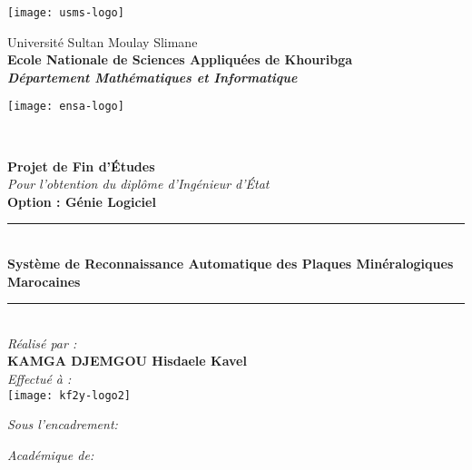 \begin{titlepage}
\begin{minipage}{2cm}
	\begin{flushleft}
		\texttt{[image: usms-logo]}
	\end{flushleft}
\end{minipage}\hfill
\begin{minipage}{12cm}
	\begin{center}
		Université Sultan Moulay Slimane\\
		\textbf{Ecole Nationale de Sciences Appliquées de Khouribga}\\
		\textit{\textbf{Département Mathématiques et Informatique}}
	\end{center}
\end{minipage}\hfill
\begin{minipage}{2cm}
	\begin{flushright}
		\texttt{[image: ensa-logo]}
	\end{flushright}
\end{minipage}\\
\begin{center}
{\large \bfseries Projet de Fin d’Études}\\[0.5cm]
{\large \textit{Pour l'obtention du diplôme d'Ingénieur d'État}}\\[0.5cm]
{\large \bfseries{Option : Génie Logiciel} \\ }
\vspace{10mm}
\rule{0.95\textwidth}{2pt}\vspace{0.9\baselineskip}\\
			{\Large \textrm{\textbf{Système de Reconnaissance Automatique des Plaques Minéralogiques Marocaines}}}
\rule{0.95\textwidth}{2pt}\\
\vspace{10mm}
\emph{Réalisé par :}\\[0.5cm]
\large \textbf{\textsc{KAMGA DJEMGOU} Hisdaele Kavel}\\
\vspace{10mm}
\emph{Effectué à :}\\[0.5cm]
\texttt{[image: kf2y-logo2]}
\end{center}
\begin{center}
	\emph{Sous l'encadrement: }
\end{center}
\noindent
\begin{minipage}{0.4\textwidth}
 \begin{flushleft}
 	\centering
    \emph{Académique de:} \\[0.5cm]

\end{flushleft}
\end{minipage}
\end{titlepage}
